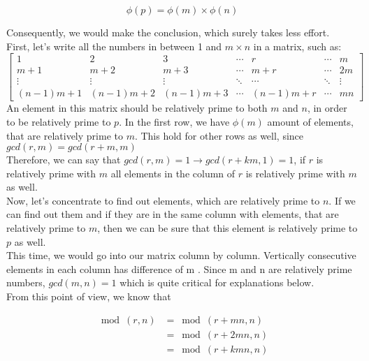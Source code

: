 \documentclass[11pt]{article}
\begin{document}
\begin{equation}
\phi(p) = \phi(m) \times \phi(n)
\end{equation}

Consequently, we would make the conclusion, which surely takes less effort. \\

First, let's write all the numbers in between 1 and $m \times n$ in a matrix, such as: \\


$\begin{bmatrix} 1 & 2 & 3 & \cdots & r & \cdots & m \\ m + 1 & m + 2 & m + 3 & \cdots & m + r & \cdots & 2m \\ \vdots & \vdots & \vdots & \ddots & \cdots & \ddots & \vdots \\ (n - 1)m + 1 & (n - 1)m + 2 & (n - 1)m + 3 & \cdots & (n - 1)m + r & \cdots & mn \end{bmatrix}$\\

An element in this matrix should be relatively prime to both $m$ and $n$, in order to be relatively prime to $p$. In the first row, we have $\phi(m)$ amount of elements, that are relatively prime to $m$. This hold for other rows as well, since $gcd(r, m) = gcd(r + m, m)$ \\

Therefore, we can say that $gcd(r,m) = 1 \rightarrow gcd(r+km, 1) = 1$, if $r$ is relatively prime with $m$ all elements in the column of $r$ is relatively prime with $m$ as well. \\

Now, let's concentrate to find out elements, which are relatively prime to $n$. If we can find out them and if they are in the same column with elements, that are relatively prime to $m$, then we can be sure that this element is relatively prime to $p$ as well.\\

This time, we would go into our matrix column by column. Vertically consecutive elements in each column has difference of m . Since m and n are relatively prime numbers, $gcd(m,n) = 1$ which is quite critical for explanations below.\\

From this point of view, we know that 

\begin{equation}
\begin{split}
\bmod (r, n) &= \bmod(r + mn, n) \\
&= \bmod(r + 2mn, n) \\
&=  \bmod(r + kmn, n) 
\end{split}
\end{equation}
\end{document}
